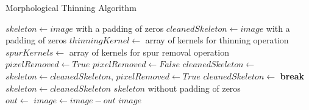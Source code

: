 \begin{algorithm}[H]
  \footnotesize
  \caption{Morphological Thinning Algorithm}
  \label{algo:morph}
  \begin{algorithmic}[1]
     
      \State $skeleton \gets image$ with a padding of zeros 
      \State $cleanedSkeleton \gets image$ with a padding of zeros 
      \State $thinningKernel \gets$ array of kernels for thinning operation
      \State $spurKernels \gets$ array of kernels for spur removal operation
      \State $pixelRemoved \gets True$
       
        \State $pixelRemoved\gets False$ 
        \State $cleanedSkeleton \gets$  
          \State $skeleton \gets cleanedSkeleton$, $pixelRemoved \gets True$
        \EndIf
      \EndWhile
       
        \State $cleanedSkeleton \gets$  
         \textbf{break}\EndIf        
        \State $skeleton \gets cleanedSkeleton$
      \EndFor
      \State \Return $skeleton$ without padding of zeros
    \EndFunction
\\
      \State $out \gets$ 
      \State $image \gets image - out$
    \EndFor
    \State \Return $image$
    \EndFunction
  \end{algorithmic}
\end{algorithm}
